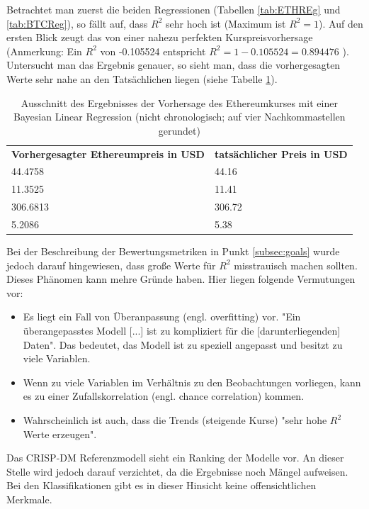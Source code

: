 Betrachtet man zuerst die beiden Regressionen (Tabellen \ref{tab:ETHREg} und \ref{tab:BTCReg}), so fällt auf, dass $ R^2 $ sehr hoch ist (Maximum ist $ R^2 = 1 $). Auf den ersten Blick zeugt das von einer nahezu perfekten Kurspreisvorhersage (Anmerkung: Ein $ R^2 $ von -0.105524 entspricht  $ R^2 = 1 - 0.105524 = 0.894476 $ ). Untersucht man das Ergebnis genauer, so sieht man, dass die vorhergesagten Werte sehr nahe an den Tatsächlichen liegen (siehe Tabelle \ref{tab:scoredReal}).
\begin{table}[H]
\centering
\begin{tabular}{|p{4cm}|p{4cm}|}
\hline
\textbf{Vorhergesagter Ethereumpreis in USD} & \textbf{tatsächlicher Preis in USD}\\ 
\hhline{==}
44.4758 & 44.16 \\ \hline
11.3525 & 11.41 \\ \hline
306.6813 & 306.72 \\ \hline
5.2086 & 5.38 \\ \hline
\end{tabular}
\caption{Ausschnitt des Ergebnisses der Vorhersage des Ethereumkurses mit einer Bayesian Linear Regression (nicht chronologisch; auf vier Nachkommastellen gerundet)}
\label{tab:scoredReal}
\end{table}
Bei der Beschreibung der Bewertungsmetriken in Punkt \ref{subsec:goals} wurde jedoch darauf hingewiesen, dass große Werte für $ R^2 $ misstrauisch machen sollten. Dieses Phänomen kann mehre Gründe haben. Hier liegen folgende Vermutungen vor:
\begin{itemize}
\item Es liegt ein Fall von Überanpassung (engl. overfitting) vor. "Ein überangepasstes Modell [...] ist zu kompliziert für die [darunterliegenden] Daten"\citep[eigene Übersetzung]{frost_danger_2015}. Das bedeutet, das Modell ist zu speziell angepasst und besitzt zu viele Variablen.
\item Wenn zu viele Variablen im Verhältnis zu den Beobachtungen vorliegen, kann es zu einer Zufallskorrelation (engl. chance correlation) kommen.\citep{lohninger_teach/me_1999}
\item Wahrscheinlich ist auch, dass die Trends (steigende Kurse) "sehr hohe $ R^2 $ Werte erzeugen".\citep[eigene Übersetzung]{frost_five_2016}
\end{itemize}
Das CRISP-DM Referenzmodell sieht ein Ranking der Modelle vor. An dieser Stelle wird jedoch darauf verzichtet, da die Ergebnisse noch Mängel aufweisen.
Bei den Klassifikationen gibt es in dieser Hinsicht keine offensichtlichen Merkmale.\newline 
